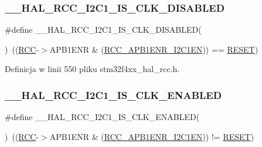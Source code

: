 \subsubsection{\texorpdfstring{\+\_\+\+\_\+\+H\+A\+L\+\_\+\+R\+C\+C\+\_\+\+I2\+C1\+\_\+\+I\+S\+\_\+\+C\+L\+K\+\_\+\+D\+I\+S\+A\+B\+L\+ED}{\_\_HAL\_RCC\_I2C1\_IS\_CLK\_DISABLED}}
{\footnotesize\ttfamily \#define \+\_\+\+\_\+\+H\+A\+L\+\_\+\+R\+C\+C\+\_\+\+I2\+C1\+\_\+\+I\+S\+\_\+\+C\+L\+K\+\_\+\+D\+I\+S\+A\+B\+L\+ED(\begin{DoxyParamCaption}{ }\end{DoxyParamCaption})~((\hyperlink{group___peripheral__declaration_ga74944438a086975793d26ae48d5882d4}{R\+CC}-\/$>$A\+P\+B1\+E\+NR \& (\hyperlink{group___peripheral___registers___bits___definition_ga5ca3afe0c517702b2d1366b692c8db0e}{R\+C\+C\+\_\+\+A\+P\+B1\+E\+N\+R\+\_\+\+I2\+C1\+EN})) == \hyperlink{group___exported__types_gga89136caac2e14c55151f527ac02daaffa589b7d94a3d91d145720e2fed0eb3a05}{R\+E\+S\+ET})}



Definicja w linii 550 pliku stm32f4xx\+\_\+hal\+\_\+rcc.\+h.

\mbox{\label{group___r_c_c___a_p_b1___peripheral___clock___enable___disable___status_ga7570e5654fd61b44dabe0546e524c906}} 
\subsubsection{\texorpdfstring{\+\_\+\+\_\+\+H\+A\+L\+\_\+\+R\+C\+C\+\_\+\+I2\+C1\+\_\+\+I\+S\+\_\+\+C\+L\+K\+\_\+\+E\+N\+A\+B\+L\+ED}{\_\_HAL\_RCC\_I2C1\_IS\_CLK\_ENABLED}}
{\footnotesize\ttfamily \#define \+\_\+\+\_\+\+H\+A\+L\+\_\+\+R\+C\+C\+\_\+\+I2\+C1\+\_\+\+I\+S\+\_\+\+C\+L\+K\+\_\+\+E\+N\+A\+B\+L\+ED(\begin{DoxyParamCaption}{ }\end{DoxyParamCaption})~((\hyperlink{group___peripheral__declaration_ga74944438a086975793d26ae48d5882d4}{R\+CC}-\/$>$A\+P\+B1\+E\+NR \& (\hyperlink{group___peripheral___registers___bits___definition_ga5ca3afe0c517702b2d1366b692c8db0e}{R\+C\+C\+\_\+\+A\+P\+B1\+E\+N\+R\+\_\+\+I2\+C1\+EN})) != \hyperlink{group___exported__types_gga89136caac2e14c55151f527ac02daaffa589b7d94a3d91d145720e2fed0eb3a05}{R\+E\+S\+ET})}



